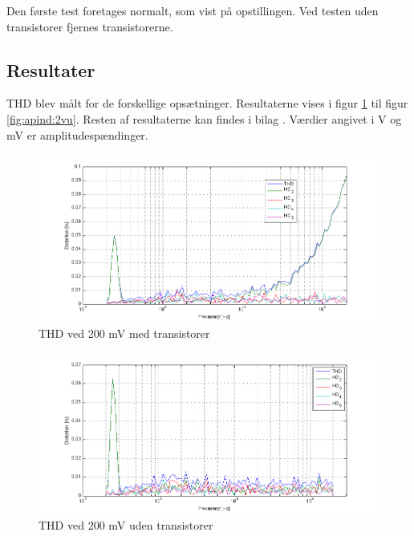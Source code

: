 Den første test foretages normalt, som vist på opstillingen. Ved testen uden transistorer fjernes transistorerne.	

\subsection*{Resultater}

THD blev målt for de forskellige opsætninger. Resultaterne vises i figur \ref{fig:apind:200mvm} til figur \ref{fig:apind:2vu}. Resten af resultaterne kan findes i bilag \cite{indgangsvaelger-maalinng}%
. Værdier angivet i V og mV er amplitudespændinger.

\begin{figure}[h]
\centering
\includegraphics[width=\textwidth]{maalerapporter/indgangsvaelger/maalinger/opa/mic-200mv-opa-muxudgang-thd.png}
\caption{THD ved 200 mV med transistorer}
\label{fig:apind:200mvm}
\end{figure}

\begin{figure}[h]
\centering
\includegraphics[width=\textwidth]{maalerapporter/indgangsvaelger/maalinger/opa/mic-200mv-opa-muxudgang-uden-transistor thd.png}
\caption{THD ved 200 mV uden transistorer}
\label{fig:apind:200mvu}
\end{figure}

